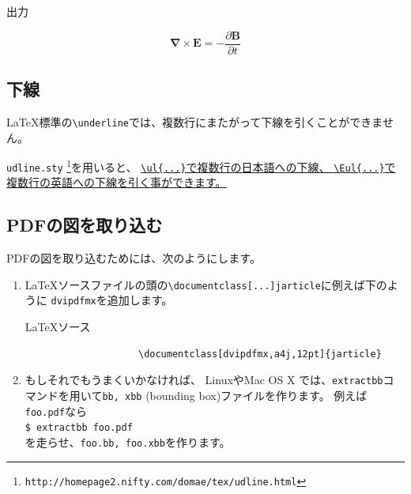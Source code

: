 \documentclass[dvipdfmx,a4j,11pt]{jarticle}
\newenvironment{inputbox}{%
	\begin{itembox}[r]{\LaTeX ソース}
}{
	\end{itembox}
}
\newenvironment{outputbox}{%
	\begin{itembox}[r]{出力}
}{%
	\end{itembox}
}
\begin{document}
	\begin{outputbox}
				\[ \bm{\nabla} \times \bm{E} = -\frac{\partial \bm{B}}{\partial t} \]
	\end{outputbox}
	
\subsection{下線}
	\LaTeX 標準の{\tt \textbackslash underline}では、複数行にまたがって下線を引くことができません。
	
	{\tt udline.sty} 
	\footnote{{\tt http://homepage2.nifty.com/domae/tex/udline.html}}を用いると、
	\ul{{\tt \textbackslash ul\{...\}}で複数行の日本語への下線、
	{\tt \textbackslash Eul\{...\}}で複数行の英語への下線を引く事ができます。}
	
\subsection{PDFの図を取り込む}
	PDFの図を取り込むためには、次のようにします。
	\begin{enumerate}
		\item \LaTeX ソースファイルの頭の{\tt \textbackslash documentclass[...]{jarticle}}に例えば下のように
			\verb"dvipdfmx"を追加します。
			\begin{inputbox}
				\begin{verbatim}
					\documentclass[dvipdfmx,a4j,12pt]{jarticle}
				\end{verbatim}
			\end{inputbox}
		\item もしそれでもうまくいかなければ、
			LinuxやMac OS X では、{\tt extractbb}コマンドを用いて{\tt bb, xbb} (bounding box)ファイルを作ります。
			例えば{\tt foo.pdf}なら\\
			{\tt \$ extractbb foo.pdf}\\
			を走らせ、{\tt foo.bb, foo.xbb}を作ります。
			
	\end{enumerate}
	
\end{document}
